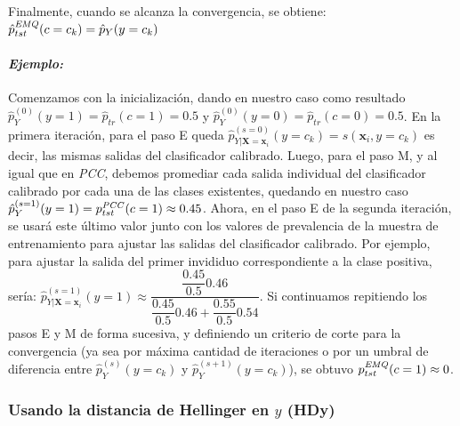 Finalmente, cuando se alcanza la convergencia, se obtiene: $\hat p^{\it EMQ
\/}_{tst}(c=c_k) = \hat p_{Y}(y=c_k)$

\paragraph{\it Ejemplo:\/} Comenzamos con la inicialización, dando en nuestro
caso como resultado $\hat p^{(0)}_{Y}(y=1) = \hat p_{tr}(c=1) = 0.5$ y $\hat
p^{(0)}_{Y}(y=0) = \hat p_{tr}(c=0) = 0.5$. En la primera iteración, para el
paso E queda $\hat p^{(s=0)}_{Y|\boldsymbol{X}=\boldsymbol{x}_i}(y=c_k) =
s(\boldsymbol{x}_i, y=c_k)$ es decir, las mismas salidas del clasificador
calibrado. Luego, para el paso M, y al igual que en {\it PCC}, debemos promediar
cada salida individual del clasificador calibrado por cada una de las clases
existentes, quedando en nuestro caso $\hat p^{(s=1)}_{Y}(y=1) = p^{\it
PCC\/}_{tst}(c=1) \approx 0.45$. Ahora, en el paso E de la segunda iteración, se
usará este último valor junto con los valores de prevalencia de la muestra de
entrenamiento para ajustar las salidas del clasificador calibrado. Por ejemplo,
para ajustar la salida del primer invididuo correspondiente a la clase positiva,
sería: $\hat p^{(s=1)}_{Y|\boldsymbol{X}=\boldsymbol{x}_i}(y=1) \approx
\dfrac{\dfrac{0.45}{0.5}0.46}{\dfrac{0.45}{0.5}0.46+\dfrac{0.55}{0.5}0.54}$. Si
continuamos repitiendo los pasos E y M de forma sucesiva, y definiendo un
criterio de corte para la convergencia (ya sea por máxima cantidad de
iteraciones o por un umbral de diferencia entre $\hat p^{(s)}_{Y}(y=c_k)$ y
$\hat p^{(s+1)}_{Y}(y=c_k)$), se obtuvo $p^{\it EMQ \/}_{tst}(c=1) \approx 0$.

\subsubsection{Usando la distancia de Hellinger en $y$ (HDy)}\label{puntual:hdy}

